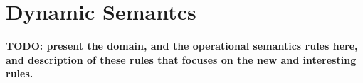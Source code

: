 \section{Dynamic Semantcs}
\label{sec:semantics}

{\bf TODO: present the domain, and the operational semantics rules here, 
and description of these rules that focuses on the new and interesting rules.}

